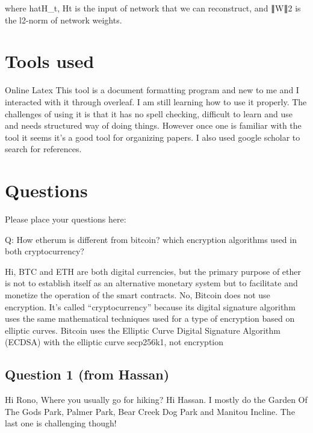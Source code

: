 \documentclass{article}
\begin{document}
where hat{H}_t, Ht  is the input of network that we can reconstruct, and ∥W∥2 is the l2-norm of network weights.

\nocite{jain2004introduction}
\nocite{yu2003ga}
\nocite{roy2018protection}
\nocite{zhang2021research}
\nocite{lecun2015deep}
\nocite{bai2021know}
\nocite{yu2021information}
\nocite{xu2018industry}
\nocite{culot2019addressing}
\nocite{meneghello2019iot}
\nocite{wang2019blockchain}
\nocite{falco2018iiot}
\nocite{pan2015classification}
\nocite{zhang2003data}
\nocite{demertzis2018next}
\nocite{hao2016mining}
\nocite{zhao2019blockchain}
\nocite{gurdgiev2021informational}
\nocite{jain2004introduction}
\nocite{podder2021artificial}

\medskip

\section{Tools used}
Online Latex
This tool is a document formatting program and new to me and I interacted with it through overleaf. I am still learning how to use it properly. The challenges of using it is that it has no spell checking, difficult to learn and use and  needs structured way of doing things. However once one is familiar with the tool it seems it's a good tool for organizing papers. I also used google scholar to search for references. 


\section{Questions}
Please place your questions here:

Q: How etherum is different from bitcoin? which encryption algorithms used in both cryptocurrency?

Hi,
BTC and ETH are both digital currencies, but the primary purpose of ether is not to establish itself as an alternative monetary system but to facilitate and monetize the operation of the smart contracts. 
No, Bitcoin does not use encryption. It's called “cryptocurrency” because its digital signature algorithm uses the same mathematical techniques used for a type of encryption based on elliptic curves. Bitcoin uses the Elliptic Curve Digital Signature Algorithm (ECDSA) with the elliptic curve secp256k1, not encryption

\subsection{Question 1 (from Hassan)}
Hi Rono, Where you usually go for hiking?
Hi Hassan. I mostly do the Garden Of The Gods Park, Palmer Park, Bear Creek Dog Park and Manitou Incline. The last one is challenging though!

\printbibliography
\end{document}
